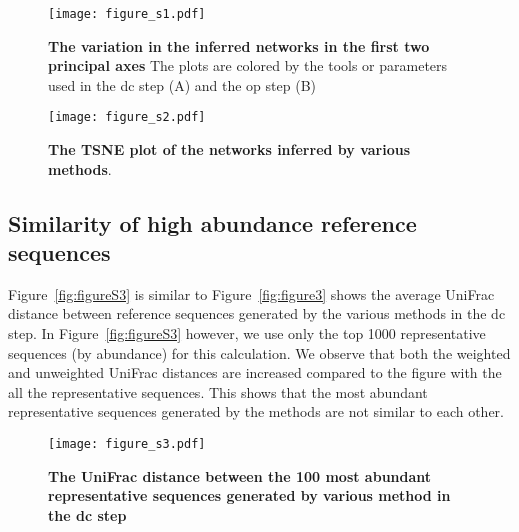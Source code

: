     \begin{figure}[H]
      \centering
      \texttt{[image: figure\_s1.pdf]}
    \end{figure}
    \begin{figure}[H]
      \centering
        \caption{
          \textbf{The variation in the inferred networks in the first two principal axes}
          The plots are colored by the tools or parameters used in the \ac{dc} step (A) and the \ac{op} step (B)
        }
      \label{fig:figure_s1}
    \end{figure}
    \FloatBarrier
    \newpage

    \begin{figure}[H]
      \centering
      \texttt{[image: figure\_s2.pdf]}
    \end{figure}
    \begin{figure}[H]
      \centering
        \caption{
          \textbf{The TSNE plot of the networks inferred by various methods}.
        }
      \label{fig:figure_s2}
    \end{figure}
    \FloatBarrier
    \newpage



  \subsection*{Similarity of high abundance reference sequences}

    Figure~\ref{fig:figureS3} is similar to Figure~\ref{fig:figure3} shows the average UniFrac distance between reference sequences generated by the various methods in the \ac{dc} step.
    In Figure~\ref{fig:figureS3} however, we use only the top 1000 representative sequences (by abundance) for this calculation.
    We observe that both the weighted and unweighted UniFrac distances are increased compared to the figure with the all the representative sequences.
    This shows that the most abundant representative sequences generated by the methods are not similar to each other.

    \begin{figure}[H]
      \centering
      \texttt{[image: figure\_s3.pdf]}
    \end{figure}
    \begin{figure}[H]
      \centering
        \caption{
          \textbf{The UniFrac distance between the 100 most abundant representative sequences generated by various method in the \ac{dc} step}
        }
      \label{fig:figure_s3}
    \end{figure}
    \FloatBarrier
    \newpage

